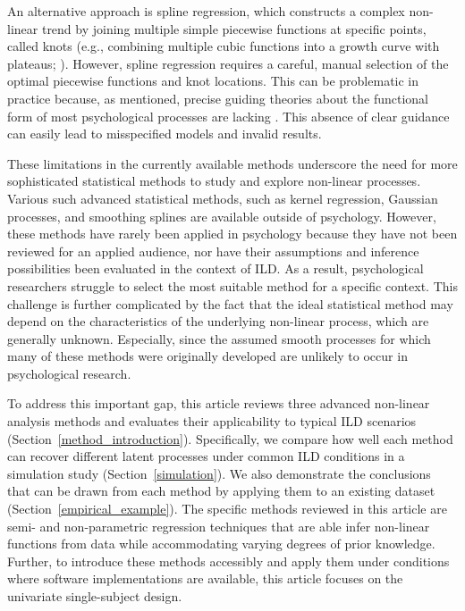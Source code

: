 \documentclass[man, floatsintext]{apa7}
\begin{document}
An alternative approach is spline regression, which constructs a complex
non-linear trend by joining multiple simple piecewise functions at specific
points, called knots (e.g., combining multiple cubic functions into a growth
curve with plateaus; \textcite{tsay_nonlinear_2019}). However, spline
regression requires a careful, manual selection of the optimal piecewise
functions and knot locations. This can be problematic in practice because, as
mentioned, precise guiding theories about the functional form of most
psychological processes are lacking \parencite{tan_time-varying_2011}. This
absence of clear guidance can easily lead to misspecified models and invalid
results.

These limitations in the currently available methods underscore the need for
more sophisticated statistical methods to study and explore non-linear
processes. Various such advanced statistical methods, such as kernel
regression, Gaussian processes, and smoothing splines are available outside of
psychology. However, these methods have rarely been applied in psychology
because they have not been reviewed for an applied audience, nor have their
assumptions and inference possibilities been evaluated in the context of ILD.\@
As a result, psychological researchers struggle to select the most suitable
method for a specific context. This challenge is further complicated by the
fact that the ideal statistical method may depend on the characteristics of the
underlying non-linear process, which are generally unknown. Especially, since
the assumed smooth processes for which many of these methods were originally
developed are unlikely to occur in psychological research.

To address this important gap, this article reviews three advanced non-linear
analysis methods and evaluates their applicability to typical ILD scenarios
(Section~\ref{method_introduction}). Specifically, we compare how well each
method can recover different latent processes under common ILD conditions in a
simulation study (Section~\ref{simulation}). We also demonstrate the
conclusions that can be drawn from each method by applying them to an existing
dataset (Section~\ref{empirical_example}). The specific methods reviewed in
this article are semi- and non-parametric regression techniques that are able
infer non-linear functions from data while accommodating varying degrees of
prior knowledge. Further, to introduce these methods accessibly and apply them
under conditions where software implementations are available, this article
focuses on the univariate single-subject design.
\end{document}
